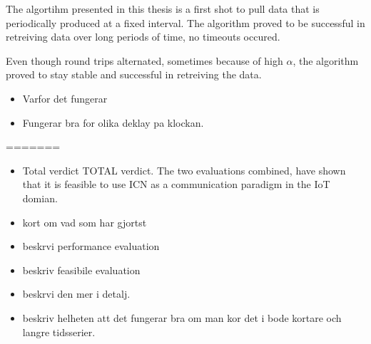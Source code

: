 The algortihm presented in this thesis is a first shot to pull data that is periodically produced at a fixed interval. The algorithm proved to be successful in retreiving data over long periods of time, no timeouts occured. %

Even though round trips alternated, sometimes because of high $\alpha$, the algorithm proved to stay stable and successful in retreiving the data. 


\begin{itemize}
\item Varfor det fungerar
\item Fungerar bra for olika deklay pa klockan.
\end{itemize}
=======
\begin{itemize}
\item Total verdict
TOTAL verdict.
The two evaluations combined, have shown that it is feasible to use ICN as a communication paradigm in the IoT domian. 
\end{itemize}

\begin{itemize}
\item kort om vad som har gjortst
\item beskrvi performance evaluation
\item beskriv feasibile evaluation
\item beskrvi den mer i detalj.
\item beskriv helheten att det fungerar bra om man kor det i bode kortare och langre tidsserier.
\end{itemize}
\newpage


